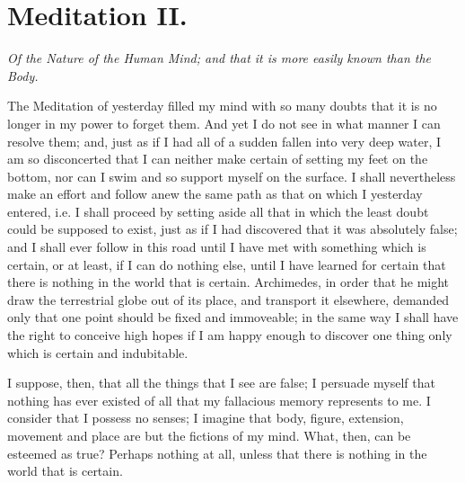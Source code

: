 \section*{Meditation II.}

\begin{center}\textit{Of the Nature of the Human Mind; and that it is
more easily known than the Body.}\end{center}

\noindent The Meditation of yesterday filled my mind with so many
doubts that it is no longer in my power to forget them. And yet I do
not see in what manner I can resolve them; and, just as if I had all
of a sudden fallen into very deep water, I am so disconcerted that I
can neither make certain of setting my feet on the bottom, nor can I
swim and so support myself on the surface. I shall nevertheless make
an effort and follow anew the same path as that on which I yesterday
entered, i.e. I shall proceed by setting aside all that in which the
least doubt could be supposed to exist, just as if I had discovered
that it was absolutely false; and I shall ever follow in this road
until I have met with something which is certain, or at least, if I
can do nothing else, until I have learned for certain that there is
nothing in the world that is certain. Archimedes, in order that he
might draw the terrestrial globe out of its place, and transport it
elsewhere, demanded only that one point should be fixed and
immoveable; in the same way I shall have the right to conceive high
hopes if I am happy enough to discover one thing only which is certain
and indubitable.

I suppose, then, that all the things that I see are false; I persuade
myself that nothing has ever existed of all that my fallacious memory
represents to me. I consider that I possess no senses; I imagine that
body, figure, extension, movement and place are but the fictions of my
mind. What, then, can be esteemed as true? Perhaps nothing at all,
unless that there is nothing in the world that is certain.


